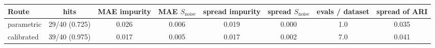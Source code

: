 \begin{tabular}{@{}lccccccc@{}}
\toprule
Route & hits & MAE impurity & MAE $S_{\text{noise}}$ & spread impurity & spread $S_{\text{noise}}$ & evals / dataset & spread of ARI \\
\midrule
parametric & 29/40 (0.725) & 0.026 & 0.006 & 0.019 & 0.000 & 1.0 & 0.035 \\
calibrated & 39/40 (0.975) & 0.017 & 0.005 & 0.017 & 0.002 & 7.0 & 0.041 \\
\bottomrule
\end{tabular}
